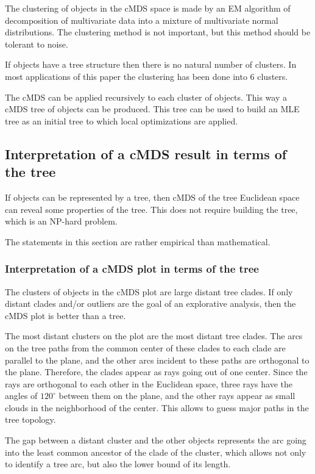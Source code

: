 \documentclass[10pt,a4paper]{article}
\begin{document}
The clustering of objects in the cMDS space is made by an EM algorithm of decomposition of multivariate data into a mixture of multivariate normal distributions.
The clustering method is not important, but this method should be tolerant to noise.

If objects have a tree structure then there is no natural number of clusters.
In most applications of this paper the clustering has been done into 6 clusters.

The cMDS can be applied recursively to each cluster of objects.
This way a cMDS tree of objects can be produced.
This tree can be used to build an MLE tree as an initial tree to which local optimizations are applied.


\subsection {Interpretation of a cMDS result in terms of the tree}

If objects can be represented by a tree, then cMDS of the tree Euclidean space can reveal some properties of the tree.
This does not require building the tree, which is an NP-hard problem.

The statements in this section are rather empirical than mathematical.


\subsubsection {Interpretation of a cMDS plot in terms of the tree}

The clusters of objects in the cMDS plot are large distant tree clades.
If only distant clades and/or outliers are the goal of an explorative analysis, then the cMDS plot is better than a tree.

The most distant clusters on the plot are the most distant tree clades.
The arcs on the tree paths from the common center of these clades to each clade are parallel to the plane, and the other arcs incident to these paths are orthogonal to the plane.
Therefore, the clades appear as rays going out of one center.
Since the rays are orthogonal to each other in the Euclidean space, three rays have the angles of $120^\circ$ between them on the plane, and the other rays appear as small clouds in the neighborhood of the center.
This allows to guess major paths in the tree topology.

The gap between a distant cluster and the other objects represents the arc going into the least common ancestor of the clade of the cluster, which allows not only to identify a tree arc, but also the lower bound of its length.
\end{document}
